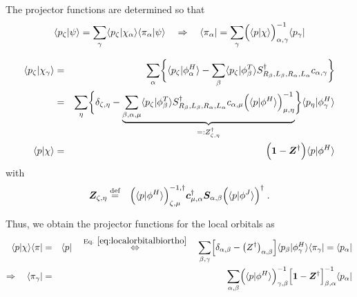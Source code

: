 \documentclass[11pt,a4paper]{report}
\begin{document}
The projector functions are determined so that
\begin{eqnarray}
\langle{p}_\zeta|\psi\rangle
=
\sum_\gamma
\langle{p}_\zeta|\chi_\alpha\rangle\langle\pi_\alpha|\psi\rangle
\quad
\Rightarrow\quad
\langle\pi_\alpha|=
\sum_\gamma \Bigl(\langle{p}|\chi\rangle\Bigr)^{-1}_{\alpha,\gamma}
\langle{p}_\gamma|
\end{eqnarray}


\begin{eqnarray}
\langle{p}_\zeta|\chi_\gamma\rangle&=&
\sum_\alpha
\biggl\lbrace
\langle{p}_\zeta|\phi^H_\alpha\rangle
-
\sum_\beta 
\langle{p}_\zeta|\phi^T_{\beta}\rangle 
S^\dagger_{R_\beta,L_\beta,R_\alpha,L_\alpha}c_{\alpha,\gamma}
\biggr\rbrace 
\nonumber\\
&=&
\sum_{\eta}
\biggl\lbrace
\delta_{\zeta,\eta}
-
\underbrace{
\sum_{\beta,\alpha,\mu}
\langle{p}_\zeta|\phi^T_{\beta}\rangle S^\dagger_{R_\beta,L_\beta,R_\alpha,L_\alpha}
c_{\alpha,\mu}
\Bigl(\langle{p}|\phi^H\rangle\Bigr)^{-1}_{\mu,\eta}
}_{=:Z^\dagger_{\zeta,\eta}}
\biggr\rbrace  \langle{p}_\eta|\phi^H_\gamma\rangle 
\nonumber\\
%
\langle{p}|\chi\rangle
&=&\Bigl(\mat{1}-\mat{Z}^\dagger\Bigr)\langle{p}|\phi^H\rangle
\label{eq:localorbitalbiortho}
\end{eqnarray}
with
\begin{eqnarray}
\bm{Z}_{\zeta,\eta}&\stackrel{\text{def}}{=}&
\Bigl(\langle{p}|\phi^H\rangle\Bigr)^{-1,\dagger}_{\zeta,\mu}
\bm{c}^\dagger_{\mu,\alpha}
\bm{S}_{\alpha,\beta}
\Bigl(\langle{p}|\phi^J\rangle\Bigr)^\dagger\;.
\label{eq:zmatfromstructureconstants}
\end{eqnarray}

Thus, we obtain the projector functions for the local orbitals as
\begin{eqnarray}
\langle{p}|\chi\rangle\langle\pi|&=&\langle{p}|
%
%
\quad\eqrel{eq:localorbitalbiortho}{\Leftrightarrow}\quad
\sum_{\beta,\gamma}
\Bigl[\delta_{\alpha,\beta}-\left(Z^\dagger\right)_{\alpha,\beta}\Bigr]
\langle{p}_\beta|\phi^H_\gamma\rangle
\langle\pi_\gamma|
=\langle{p}_\alpha|
\nonumber\\
%
\Rightarrow\quad\langle\pi_{\gamma}|&=&
\sum_{\alpha,\beta}
\Bigl(\langle{p}|\phi^H\rangle\Bigr)^{-1}_{\gamma,\beta}
\Bigl[\mat{1}-\mat{Z}^\dagger\Bigr]^{-1}_{\beta,\alpha}  
\langle{p}_\alpha|
\label{eq:chiprojectofintermsofphiprojector}
\end{eqnarray}


\end{document}
